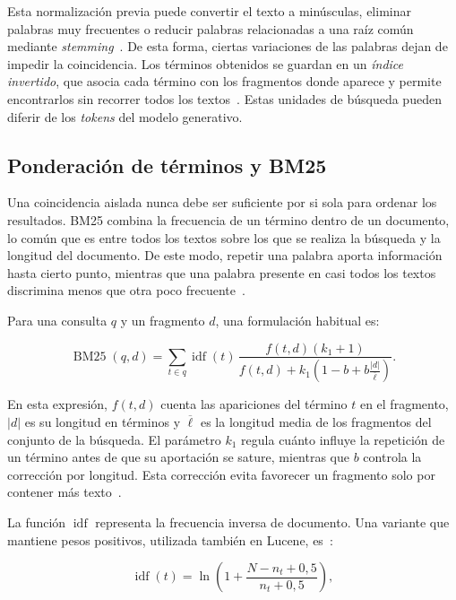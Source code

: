 Esta normalización previa puede convertir el texto a minúsculas, eliminar
palabras muy frecuentes o reducir palabras relacionadas a una raíz común
mediante \textit{stemming}~\cite{trotman2014bm25}. De esta forma, ciertas variaciones de las
palabras dejan de impedir la coincidencia. Los términos obtenidos se guardan en
un \textit{índice invertido}, que asocia cada término con los fragmentos donde
aparece y permite encontrarlos sin recorrer todos los
textos~\cite{manning2008ir}. Estas unidades de búsqueda pueden diferir de los
\textit{tokens} del modelo generativo.

\subsection{Ponderación de términos y BM25}

Una coincidencia aislada nunca debe ser suficiente por si sola para ordenar los
resultados. \acs{BM25} combina la frecuencia de un término dentro de un
documento, lo común que es entre todos los textos sobre los que se realiza la
búsqueda y la longitud del documento. De este
modo, repetir una palabra aporta información hasta cierto punto, mientras que
una palabra presente en casi todos los textos discrimina menos que otra poco
frecuente~\cite{trotman2014bm25}.

Para una consulta $q$ y un fragmento $d$, una formulación habitual es:

\begin{equation}
    \operatorname{BM25}(q,d) =
    \sum_{t\in q}\operatorname{idf}(t)\,
    \frac{f(t,d)(k_1+1)}
    {f(t,d)+k_1\left(1-b+b\frac{|d|}{\overline{\ell}}\right)}.
    \label{eq:teoria-bm25}
\end{equation}

En esta expresión, $f(t,d)$ cuenta las apariciones del término $t$ en el fragmento, $|d|$ es su longitud en términos y $\overline{\ell}$ es la longitud media de los fragmentos del conjunto de la búsqueda. El parámetro $k_1$ regula cuánto influye la repetición de un término antes de que su aportación se sature, mientras que $b$ controla la corrección por longitud. Esta corrección evita favorecer un fragmento solo por contener más texto~\cite{robertson2009bm25}.

La función $\operatorname{idf}$ representa la frecuencia inversa de documento. Una variante que mantiene pesos positivos, utilizada también en Lucene, es~\cite{lucene_bm25}:

\begin{equation}
    \operatorname{idf}(t)=
    \ln\left(1+\frac{N-n_t+0{,}5}{n_t+0{,}5}\right),
    \label{eq:teoria-idf}
\end{equation}

